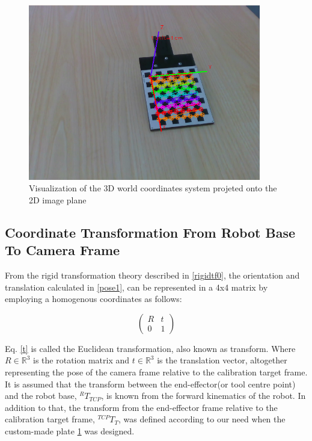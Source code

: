 \begin{figure}[!h]
\begin{center}
\includegraphics[width=4in]{figures03/calibrationtarget1.png}
\caption{Visualization of the 3D world coordinates system projeted onto the 2D image plane}
\label{fig:target3}
\end{center}
\end{figure}



\subsection{Coordinate Transformation From Robot Base To Camera Frame}
From the rigid transformation theory described in \ref{rigidtf0}, the orientation and translation calculated in \ref{pose1}, can be represented in a 4x4 matrix by employing a homogenous coordinates as follows:

\begin{equation}
\begin{pmatrix}
R & t \\ \label{t}
0 & 1
\end{pmatrix}
\end{equation}

Eq. \ref{t} is called the Euclidean transformation, also known as transform. Where $R \in \mathbb{R}^{3}$ is the rotation matrix and $t \in \mathbb{R}^{3}$ is the translation vector, altogether representing the pose of the camera frame relative to the calibration target frame.\\
It is assumed that the transform between the end-effector(or tool centre point) and the robot base, $ ^{R}T_{TCP}$, is known from the forward kinematics of the robot. In addition to that, the transform from the end-effector frame relative to the calibration target frame, $ ^{TCP}T_{T}$, was defined according to our need when the custom-made plate \ref{fig:target3} was designed.

